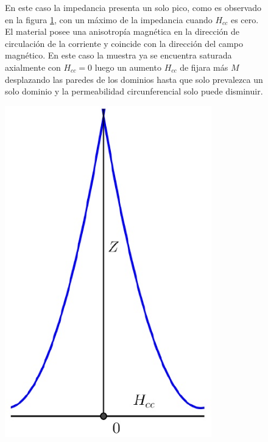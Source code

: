 \begin{figure}[H]
  \begin{minipage}[b]{0.47\textwidth}
En este caso la impedancia presenta un solo pico, como es observado en la figura \ref{fig:322}, con un máximo de la impedancia cuando $H_{cc}$ es cero. El material posee una anisotropía magnética en la dirección de circulación de la corriente y coincide con la dirección del campo magnético. En este caso la muestra ya se encuentra saturada axialmente con $H_{cc}=0$ luego un aumento $H_{cc}$ de fijara más $M$ desplazando las paredes de los dominios hasta que solo prevalezca un solo dominio y la permeabilidad circunferencial solo puede disminuir.
  \vspace{1.5cm}
  \end{minipage}
  \hfill
  \begin{minipage}[b]{0.47\textwidth}
     \includegraphics[width=0.8\textwidth]{./Figures/fig322}
	\label{fig:322}
	  \vspace{0.0cm}
  \end{minipage}
\end{figure}

